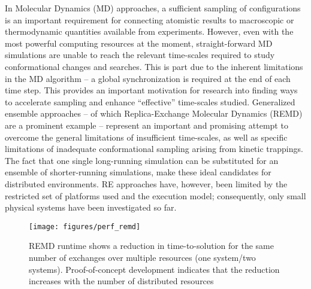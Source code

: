 \documentclass[10pt,letterpaper]{article}
\begin{document}
In Molecular Dynamics (MD) approaches, a sufficient sampling of
configurations is an important requirement for connecting atomistic
results to macroscopic or thermodynamic quantities available from
experiments.  However, even with the most powerful computing resources
at the moment, straight-forward MD simulations are unable to reach the
relevant time-scales required to study conformational changes and
searches. This is part due to the inherent limitations in the MD
algorithm -- a global synchronization is required at the end of each
time step.  This provides an important motivation for research into
finding ways to accelerate sampling and enhance ``effective''
time-scales studied. Generalized ensemble approaches -- of which
Replica-Exchange Molecular Dynamics (REMD)~\cite{Sugita:1999rm} are a
prominent example -- represent an important and promising attempt to
overcome the general limitations of insufficient time-scales, as well
as specific limitations of inadequate conformational sampling arising
from kinetic trappings.  The fact that one single long-running
simulation can be substituted for an ensemble of shorter-running
simulations, make these ideal candidates for distributed environments.
RE approaches have, however, been limited by the restricted set
of platforms used and the execution model; consequently, only small
physical systems have been investigated so far.


\begin{wrapfigure}{R}{0.5\textwidth}
    \centering
    \vspace*{0em}
    \texttt{[image: figures/perf\_remd]}
    \vspace*{-2.em}
    \caption{\footnotesize REMD runtime shows a
          reduction in time-to-solution for the same
          number of exchanges over multiple
          resources (one system/two systems). 
          Proof-of-concept development indicates that
          the reduction increases with the number of distributed
          resources~\cite{saga_papers}}
    \vspace*{-1em}
    \label{fig:performance_perf_runtime}
\end{wrapfigure}     
\end{document}
